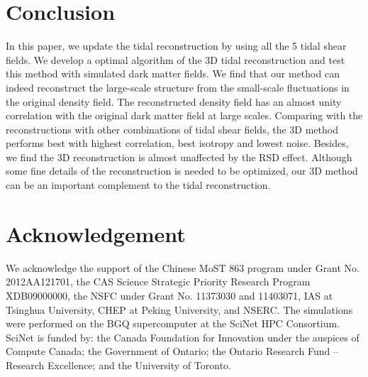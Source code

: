 \documentclass[aps,prd,twocolumn,showpacs,superscriptaddress,groupedaddress,nofootinbib]{revtex4}  %
\begin{document}
\section{Conclusion}\label{section:Conclusion}
In this paper, we update the tidal reconstruction by using all the 5 tidal shear fields. We develop a optimal algorithm of the 3D tidal reconstruction and test this method with simulated dark matter fields. We find that our method can indeed reconstruct the large-scale structure from the small-scale fluctuations in the original density field. The reconstructed density field has an almost unity correlation with the original dark matter field at large scales. Comparing with the reconstructions with other combinations of tidal shear fields, the 3D method performs best with highest correlation, best isotropy and lowest noise. Besides, we find the 3D reconstruction is almost unaffected by the RSD effect. Although some fine details of the reconstruction is needed to be optimized, our 3D method can be an important complement to the tidal reconstruction. 


\section{Acknowledgement}
We acknowledge the support of the Chinese MoST 863 program under Grant No. 2012AA121701, the CAS Science Strategic Priority Research Program XDB09000000, the NSFC under Grant No. 11373030 and 11403071, IAS at Tsinghua University, CHEP at Peking University, and NSERC. The simulations were performed on the BGQ supercomputer at the SciNet HPC Consortium. SciNet is funded by: the Canada Foundation for Innovation under the auspices of Compute Canada; the Government of Ontario; the Ontario Research Fund – Research Excellence; and the University of Toronto.



\end{document}
